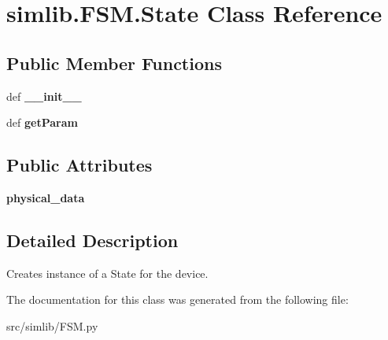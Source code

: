 \hypertarget{classsimlib_1_1_f_s_m_1_1_state}{}\section{simlib.\+F\+S\+M.\+State Class Reference}
\label{classsimlib_1_1_f_s_m_1_1_state}
\subsection*{Public Member Functions}
\begin{DoxyCompactItemize}
\item 
\mbox{\label{classsimlib_1_1_f_s_m_1_1_state_a29b361fb27793289b8e476b6fd927ae5}} 
def {\bfseries \+\_\+\+\_\+init\+\_\+\+\_\+}
\item 
\mbox{\label{classsimlib_1_1_f_s_m_1_1_state_a92eddcb3c69993196174f4626ac01cb6}} 
def {\bfseries get\+Param}
\end{DoxyCompactItemize}
\subsection*{Public Attributes}
\begin{DoxyCompactItemize}
\item 
\mbox{\label{classsimlib_1_1_f_s_m_1_1_state_ad26863e22f2f1f410b06d09d118cf340}} 
{\bfseries physical\+\_\+data}
\end{DoxyCompactItemize}


\subsection{Detailed Description}
\begin{DoxyVerb}Creates instance of a State for the device.
\end{DoxyVerb}
 

The documentation for this class was generated from the following file\+:\begin{DoxyCompactItemize}
\item 
src/simlib/F\+S\+M.\+py\end{DoxyCompactItemize}

